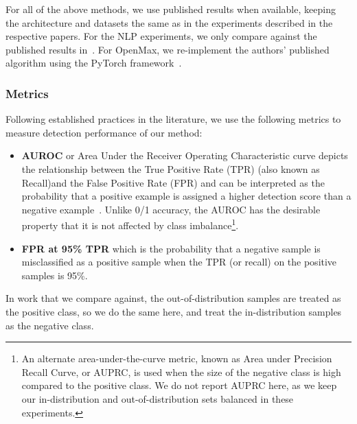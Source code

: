 \documentclass[accepted]{uai2021} \pdfoutput=1
\begin{document}
 For all of the above methods, we use published results when available, keeping the architecture and datasets the same as in the experiments described in the respective papers. For the NLP experiments, we only compare against the published results in~\cite{hendrycks2018deep}. For OpenMax, we re-implement the authors' published algorithm using the PyTorch framework~\cite{paszke2019pytorch}.

\subsubsection{Metrics}
Following established practices in the literature, we use the following metrics to measure detection performance of our method:
\begin{itemize}
	\item \textbf{AUROC} or Area Under the Receiver Operating Characteristic curve depicts the relationship between the True Positive Rate (TPR) (also known as Recall)and the False Positive Rate (FPR) and can be interpreted as the probability that a positive example is assigned a higher detection score than a negative example~\cite{fawcett2006introduction}. 
Unlike 0/1 accuracy, the AUROC has the desirable property that it is not affected by class imbalance\footnote{An alternate area-under-the-curve metric, known as Area under Precision Recall Curve, or AUPRC, is used when the size of the negative class is high compared to the positive class. We do not report AUPRC here, as we keep our in-distribution and out-of-distribution sets balanced in these experiments.}. 
	
	\item \textbf{FPR at 95\% TPR} which is  the probability that a negative sample is misclassified as a positive sample when the TPR (or recall) on the positive  samples is 95\%.
	
\end{itemize}

In work that we compare against, the out-of-distribution samples are treated as the positive class, so we do the same here, and treat the in-distribution samples as the negative class.
\end{document}
